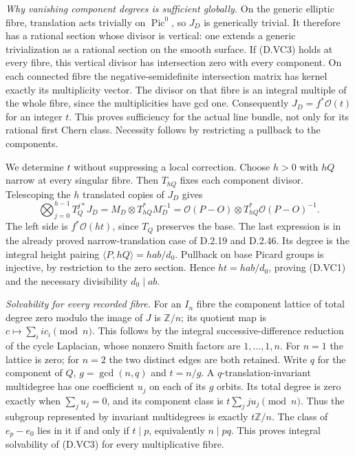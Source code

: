 \emph{Why vanishing component degrees is sufficient globally.}
On the generic elliptic fibre, translation acts trivially
on $\operatorname{Pic}^0$, so $J_D$ is generically trivial.
It therefore has a rational section whose divisor is vertical:
one extends a generic trivialization as a rational section
on the smooth surface. If (D.VC3) holds at every fibre,
this vertical divisor has intersection zero with every
component. On each connected fibre the negative-semidefinite
intersection matrix has kernel exactly its multiplicity
vector. The divisor on that fibre is an integral multiple
of the whole fibre, since the multiplicities have gcd one.
Consequently $J_D=f^*\mathcal O(t)$ for an integer $t$.
This proves sufficiency for the actual line bundle, not
only for its rational first Chern class. Necessity follows
by restricting a pullback to the components.

We determine $t$ without suppressing a local correction.
Choose $h>0$ with $hQ$ narrow at every singular fibre.
Then $T_{hQ}$ fixes each component divisor. Telescoping
the $h$ translated copies of $J_D$ gives
\[
 \bigotimes_{j=0}^{h-1} T_Q^{j*}J_D
       =M_D\otimes T_{hQ}^*M_D^{-1}
       =\mathcal O(P-O)\otimes
                    T_{hQ}^*\mathcal O(P-O)^{-1}.          \tag{D.VC5}
\]
The left side is $f^*\mathcal O(ht)$, since $T_Q$ preserves
the base. The last expression is in the already proved
narrow-translation case of D.2.19 and D.2.46. Its degree
is the integral height pairing
$\langle P,hQ\rangle=hab/d_0$.
Pullback on base Picard groups is injective, by restriction
to the zero section. Hence $ht=hab/d_0$, proving (D.VC1)
and the necessary divisibility $d_0\mid ab$.

\emph{Solvability for every recorded fibre.}
For an $I_n$ fibre the component lattice of total degree
zero modulo the image of $J$ is $\mathbb Z/n$; its quotient
map is $c\mapsto\sum_i i c_i\pmod n$.
This follows by the integral successive-difference reduction
of the cycle Laplacian, whose nonzero Smith factors are
$1,\ldots,1,n$. For $n=1$ the lattice is zero; for $n=2$
the two distinct edges are both retained.
Write $q$ for the component of $Q$, $g=\gcd(n,q)$ and
$t=n/g$. A $q$-translation-invariant multidegree has one
coefficient $u_j$ on each of its $g$ orbits. Its total degree
is zero exactly when $\sum_j u_j=0$, and its component
class is $t\sum_j j u_j\pmod n$.
Thus the subgroup represented by invariant multidegrees
is exactly $t\mathbb Z/n$. The class of $e_p-e_0$ lies in it
if and only if $t\mid p$, equivalently $n\mid pq$.
This proves integral solvability of (D.VC3) for every
multiplicative fibre.

